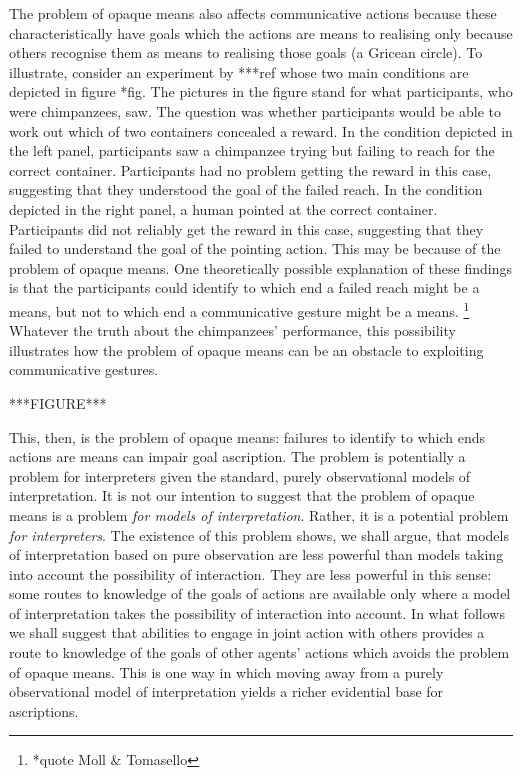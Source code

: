 \documentclass[12pt,a4paper]{extarticle}
\begin{document}
The problem of opaque means also affects communicative actions 
 because these characteristically have  goals which the actions are means to realising only because others recognise them as means to realising those goals (a Gricean circle). 
To illustrate, consider an experiment by
***ref whose two main conditions are depicted in figure *fig.
The pictures in the figure stand for what participants, who were chimpanzees, saw.
The question was whether participants would be able to work out which of two containers concealed a reward.
In the condition depicted in the left panel, participants saw a chimpanzee trying but failing to reach for the correct container. 
Participants had no problem getting the reward in this case, suggesting that they understood the goal of the failed reach.
In the condition depicted in the right panel, a human pointed at the correct container.
Participants did not reliably  get the reward in this case, suggesting that they failed to understand the goal of the pointing action.
This may be because of the problem of opaque means.
One theoretically possible explanation of these findings is that the participants could identify to which end a failed reach might be a means, but not to which end a communicative gesture might be a means.%
\footnote{
*quote Moll \& Tomasello
}
Whatever the truth about the chimpanzees' performance,
this possibility illustrates how the problem of opaque means can be an obstacle to exploiting communicative gestures.


***FIGURE***

This, then, is the problem of opaque means:
failures to identify to which ends actions are means can impair goal ascription.
The problem is potentially a problem for interpreters given the standard, purely observational models of interpretation.
It is not our intention to suggest that the problem of opaque means is a problem \emph{for models of interpretation}.
Rather, it is a potential problem \emph{for interpreters}.
The existence of this problem shows, we shall argue, that models of interpretation based on pure observation are less powerful than models taking into account the possibility of interaction.
They are less powerful in this sense: 
some routes to knowledge of the goals of actions are available only where a model of interpretation takes the possibility of interaction into account.
In what follows we shall suggest that abilities to engage in joint action with others provides a route to knowledge of the goals of other agents' actions  which avoids the problem of opaque means.
This is one way in which moving away from a purely observational model of interpretation yields a richer evidential base for ascriptions.
\end{document}

